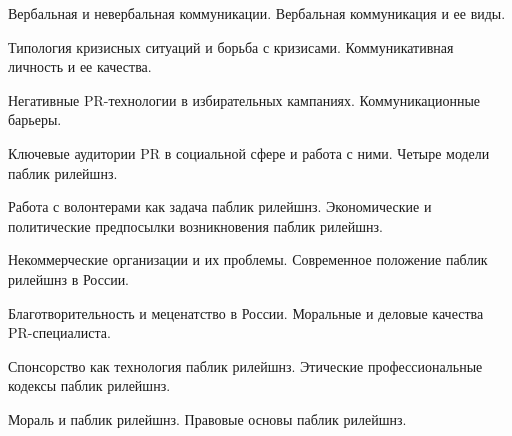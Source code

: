 \documentclass[
	14pt,
	a4paper,
	]
	{scrartcl}
\begin{document}
\newpage


\shapk
{}
\setcounter{zad}{0}

\vfill
\z Вербальная и невербальная коммуникации.
 \vfill
\z Вербальная коммуникация и ее виды.
 \vfill

\vfill

\newpage


\shapk
{}
\setcounter{zad}{0}

\vfill
\z Типология кризисных ситуаций и борьба с кризисами.
 \vfill
\z Коммуникативная личность и ее качества.
 \vfill

\vfill

\newpage


\shapk
{}
\setcounter{zad}{0}

\vfill
\z Негативные PR-технологии в избирательных кампаниях.
 \vfill
\z Коммуникационные барьеры.
 \vfill

\vfill

\newpage


\shapk
{}
\setcounter{zad}{0}

\vfill
\z Ключевые аудитории PR в социальной сфере и работа с ними.
 \vfill
\z Четыре модели паблик рилейшнз.
 \vfill

\vfill

\newpage


\shapk
{}
\setcounter{zad}{0}

\vfill
\z Работа с волонтерами как задача паблик рилейшнз.
 \vfill
\z Экономические и политические предпосылки возникновения паблик рилейшнз.
 \vfill

\vfill

\newpage


\shapk
{}
\setcounter{zad}{0}

\vfill
\z Некоммерческие организации и их проблемы.
 \vfill
\z Современное положение паблик рилейшнз в России.
 \vfill

\vfill

\newpage


\shapk
{}
\setcounter{zad}{0}

\vfill
\z Благотворительность и меценатство в России.
 \vfill
\z Моральные и деловые качества PR-специалиста.
 \vfill

\vfill

\newpage


\shapk
{}
\setcounter{zad}{0}

\vfill
\z Спонсорство как технология паблик рилейшнз.
 \vfill
\z Этические профессиональные кодексы паблик рилейшнз.
 \vfill

\vfill

\newpage


\shapk
{}
\setcounter{zad}{0}

\vfill
\z Мораль и паблик рилейшнз.
 \vfill
\z Правовые основы паблик рилейшнз.
 \vfill

\vfill

\newpage
\end{document}
